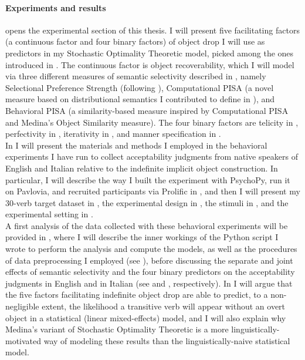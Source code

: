 \paragraph{Experiments and results}
 opens the experimental section of this thesis. I will present five facilitating factors (a continuous factor and four binary factors) of object drop I will use as predictors in my Stochastic Optimality Theoretic model, picked among the ones introduced in . The continuous factor is object recoverability, which I will model via three different measures of semantic selectivity described in , namely  Selectional Preference Strength (following \textcite{Medina2007}), Computational PISA (a novel measure based on distributional semantics I contributed to define in \textcite{CappelliLenciPISA}), and Behavioral PISA (a similarity-based measure inspired by Computational PISA and Medina's Object Similarity measure). The four binary factors are telicity in , perfectivity in , iterativity in , and manner specification in .\\
In  I will present the materials and methods I employed in the behavioral experiments I have run to collect acceptability judgments from native speakers of English and Italian relative to the indefinite implicit object construction. In particular, I will describe the way I built the experiment with PsychoPy, run it on Pavlovia, and recruited participants via Prolific in , and then I will present my 30-verb target dataset in , the experimental design in , the stimuli in , and the experimental setting in .\\
A first analysis of the data collected with these behavioral experiments will be provided in , where I will describe the inner workings of the Python script I wrote to perform the analysis and compute the models, as well as the procedures of data preprocessing I employed (see ), before discussing the separate and joint effects of semantic selectivity and the four binary predictors on the acceptability judgments in English and in Italian (see  and , respectively). In  I will argue that the five factors facilitating indefinite object drop are able to predict, to a non-negligible extent, the likelihood a transitive verb will appear without an overt object in a statistical (linear mixed-effects) model, and I will also explain why Medina's variant of Stochastic Optimality Theoretic is a more linguistically-motivated way of modeling these results than the linguistically-naive statistical model.\\
